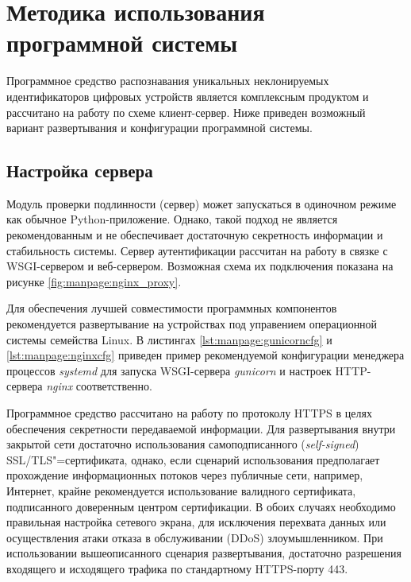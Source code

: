 \section{Методика использования программной системы}
\label{sec:manpage}

Программное средство распознавания уникальных неклонируемых идентификаторов цифровых устройств является комплексным продуктом и рассчитано на работу по схеме клиент-сервер. Ниже приведен возможный вариант развертывания и конфигурации программной системы.

\subsection{Настройка сервера}
\label{sec:manpage:server_setup}
Модуль проверки подлинности (сервер) может запускаться в одиночном режиме как обычное Python-приложение. Однако, такой подход не является рекомендованным и не обеспечивает достаточную секретность информации и стабильность системы. Сервер аутентификации рассчитан на работу в связке с WSGI-сервером и веб-сервером. Возможная схема их подключения показана на рисунке \ref{fig:manpage:nginx_proxy}.

Для обеспечения лучшей совместимости программных компонентов рекомендуется развертывание на устройствах под управением операционной системы семейства Linux. В листингах \ref{lst:manpage:gunicorncfg} и \ref{lst:manpage:nginxcfg} приведен пример рекомендуемой конфигурации менеджера процессов \emph{systemd} для запуска WSGI-сервера \emph{gunicorn} и настроек HTTP-сервера \emph{nginx} соответственно.


Программное средство рассчитано на работу по протоколу HTTPS в целях обеспечения секретности передаваемой информации. Для развертывания внутри закрытой сети достаточно использования самоподписанного (\emph{self-signed}) SSL/TLS"=сертификата, однако, если сценарий использования предполагает прохождение информационных потоков через публичные сети, например, Интернет, крайне рекомендуется использование валидного сертификата, подписанного доверенным центром сертификации. В обоих случаях необходимо правильная настройка сетевого экрана, для исключения перехвата данных или осуществления атаки отказа в обслуживании (DDoS) злоумышленником. При использовании вышеописанного сценария развертывания, достаточно разрешения входящего и исходящего трафика по стандартному HTTPS-порту 443.




